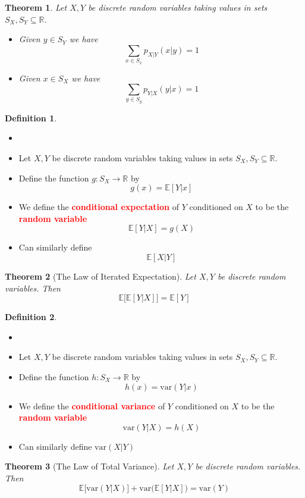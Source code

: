 \documentclass{article}
\newcommand{\R}{\mathbb{R}}
\newcommand{\E}{\mathbb{E}}
\newcommand{\var}{\text{var}}
\newcommand{\bfred}[1]{\textcolor{red}{\textbf{#1}}}
\theoremstyle{plain}
\newtheorem{thm}{Theorem}[section]
\theoremstyle{definition}
\newtheorem{defn}{Definition}[section]
\theoremstyle{remark}
\begin{document}
\begin{thm}
    Let $X,Y$ be discrete random variables taking values in sets $S_X,S_Y\subseteq\R$.
    \begin{itemize}
        \item Given $y\in S_Y$ we have \[\sum_{x\in S_x}p_{X|Y}(x|y)=1\]
        \item Given $x\in S_X$ we have \[\sum_{y\in S_y}p_{Y|X}(y|x)=1\]
    \end{itemize}
\end{thm}

\begin{defn}
    \begin{itemize}
        \item []
        \item Let $X,Y$ be discrete random variables taking values in sets $S_X,S_Y\subseteq\R$.
        \item Define the function $g:S_X\rightarrow\R$ by \[g(x)=\E[Y|x]\]
        \item We define the \bfred{conditional expectation} of $Y$ conditioned on $X$ to be the \bfred{random variable} \[\E[Y|X]=g(X)\]
        \item Can similarly define \[\E[X|Y]\]
    \end{itemize}
\end{defn}

\begin{thm}[The Law of Iterated Expectation]
    Let $X,Y$ be discrete random variables. Then \[\E\bigr[\E[Y|X]\bigr]=\E[Y]\]
\end{thm}

\begin{defn}
    \begin{itemize}
        \item []
        \item Let $X,Y$ be discrete random variables taking values in sets $S_X,S_Y\subseteq\R$.
        \item Define the function $h:S_X\rightarrow\R$ by \[h(x)=\var(Y|x)\]
        \item We define the \bfred{conditional variance} of $Y$ conditioned on $X$ to be the \bfred{random variable} \[\var(Y|X)=h(X)\]
        \item Can similarly define $\var(X|Y)$
    \end{itemize}
\end{defn}

\begin{thm}[The Law of Total Variance]
    Let $X,Y$ be discrete random variables. Then \[\E\bigr[\var(Y|X)\bigr]+\var\bigr(\E[Y|X]\bigr)=\var(Y)\]
\end{thm}
\end{document}
